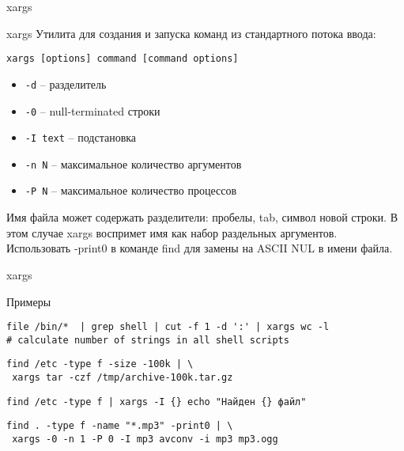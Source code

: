 \begin{frame}[fragile]{xargs}
	\begin{block}{xargs}
			Утилита для создания и запуска команд из стандартного потока ввода:
		\begin{verbatim}
xargs [options] command [command options]
                \end{verbatim}
		\begin{itemize}
			\item {\tt -d} -- разделитель
			\item {\tt -0} -- null-terminated строки
			\item {\tt -I text} -- подстановка
			\item {\tt -n N} -- максимальное количество аргументов
			\item {\tt -P N} -- максимальное количество процессов
		\end{itemize}

	\end{block}
Имя файла может содержать разделители: пробелы, tab, символ новой строки. В этом случае xargs воспримет имя как набор раздельных аргументов. Использовать -print0 в команде find для замены на ASCII NUL в имени файла.
\end{frame}

\begin{frame}[fragile]{xargs}
	\begin{block}{Примеры}

		\begin{verbatim}
file /bin/*  | grep shell | cut -f 1 -d ':' | xargs wc -l 
# calculate number of strings in all shell scripts
                \end{verbatim}

		\begin{verbatim}
find /etc -type f -size -100k | \
 xargs tar -czf /tmp/archive-100k.tar.gz
                \end{verbatim}

		\begin{verbatim}
find /etc -type f | xargs -I {} echo "Найден {} файл"
                \end{verbatim}

		\begin{verbatim}
find . -type f -name "*.mp3" -print0 | \
 xargs -0 -n 1 -P 0 -I mp3 avconv -i mp3 mp3.ogg
                \end{verbatim}
	
	\end{block}
\end{frame}
